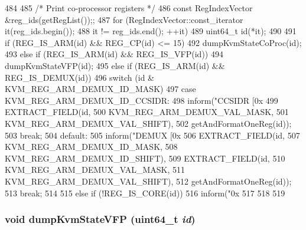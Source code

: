 \begin{DoxyCode}
484 {
485     /* Print co-processor registers */
486     const RegIndexVector &reg_ids(getRegList());;
487     for (RegIndexVector::const_iterator it(reg_ids.begin());
488          it != reg_ids.end(); ++it) {
489         uint64_t id(*it);
490 
491         if (REG_IS_ARM(id) && REG_CP(id) <= 15) {
492             dumpKvmStateCoProc(id);
493         } else if (REG_IS_ARM(id) && REG_IS_VFP(id)) {
494             dumpKvmStateVFP(id);
495         } else if (REG_IS_ARM(id) && REG_IS_DEMUX(id)) {
496             switch (id & KVM_REG_ARM_DEMUX_ID_MASK) {
497               case KVM_REG_ARM_DEMUX_ID_CCSIDR:
498                 inform("CCSIDR [0x%
499                        EXTRACT_FIELD(id,
500                                      KVM_REG_ARM_DEMUX_VAL_MASK,
501                                      KVM_REG_ARM_DEMUX_VAL_SHIFT),
502                        getAndFormatOneReg(id));
503                 break;
504               default:
505                 inform("DEMUX [0x%
506                        EXTRACT_FIELD(id,
507                                      KVM_REG_ARM_DEMUX_ID_MASK,
508                                      KVM_REG_ARM_DEMUX_ID_SHIFT),
509                        EXTRACT_FIELD(id,
510                                      KVM_REG_ARM_DEMUX_VAL_MASK,
511                                      KVM_REG_ARM_DEMUX_VAL_SHIFT),
512                        getAndFormatOneReg(id));
513                 break;
514             }
515         } else if (!REG_IS_CORE(id)) {
516             inform("0x%
517         }
518     }
519 }
\end{DoxyCode}
\hypertarget{classArmKvmCPU_a3d102e15d4e84df462b8c31ec2f7ee0c}{
\subsubsection[{dumpKvmStateVFP}]{\setlength{\rightskip}{0pt plus 5cm}void dumpKvmStateVFP (uint64\_\-t {\em id})}}
\label{classArmKvmCPU_a3d102e15d4e84df462b8c31ec2f7ee0c}



